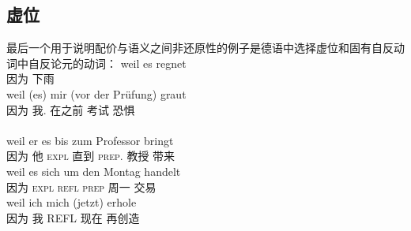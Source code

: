 \begin{exe}
\begin{xlist}[iv.]
\begin{exe}
\begin{xlist}[iv.]
\subsection{虚位}
\label{sec-expletives}

最后一个用于说明配价与语义之间非还原性的例子是德语中选择虚位和固有自反动词中自反论元的动词：
\eal
\ex 
\gll weil es regnet\\
     因为 \expl{} 下雨\\
\ex 
\gll weil (es) mir (vor der Prüfung) graut\\
     因为 \expl{} 我.\dat{} 在之前  考试 恐惧\\\\
\ex\label{ex-zum-Professor}
\gll weil er es bis zum Professor bringt\\
     因为 他 \textsc{expl} 直到 \textsc{prep}. 教授 带来\\
\ex 
\gll weil es sich um den Montag handelt\\
     因为 \textsc{expl} \textsc{refl} \textsc{prep}  周一 交易\\
\ex 
\gll weil ich mich (jetzt) erhole\\
     因为 我 REFL 现在 再创造\\

\end{xlist}
\end{exe}
\end{xlist}
\end{exe}

